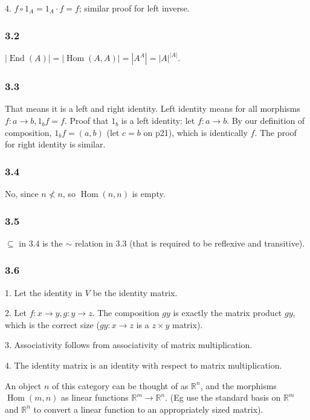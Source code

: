\documentclass{article}
\DeclareMathOperator{\Hom}{Hom}
\DeclareMathOperator{\End}{End}
\def\R{\mathbb{R}}
\begin{document}
4. $f \circ 1_A = 1_A \cdot f = f$; similar proof for left inverse.

\subsubsection*{3.2}

$|\End(A)| = |\Hom(A, A)| = |A^A| = |A|^{|A|}$.

\subsubsection*{3.3}

That means it is a left and right identity. Left identity means for all morphisms $f: a \to b, 1_bf = f$. Proof that $1_b$ is a left identity: let $f: a \to b$. By our definition of composition, $1_bf = (a, b)$ (let $c = b$ on p21), which is identically $f$. The proof for right identity is similar.

\subsubsection*{3.4}

No, since $n \not< n$, so $\Hom(n, n)$ is empty.

\subsubsection*{3.5}

$\subseteq$ in 3.4 is the $\sim$ relation in 3.3 (that is required to be reflexive and transitive).

\subsubsection*{3.6}

1. Let the identity in $V$ be the identity matrix.

2. Let $f: x \to y, g: y \to z$. The composition $gy$ is exactly the matrix product $gy$, which is the correct size ($gy: x \to z$ is a $z \times y$ matrix).

3. Associativity follows from associativity of matrix multiplication.

4. The identity matrix is an identity with respect to matrix multiplication.

An object $n$ of this category can be thought of as $\R^n$, and the morphisms $\Hom(m, n)$ as linear functions $\R^m \to \R^n$. (Eg use the standard basis on $\R^m$ and $\R^n$ to convert a linear function to an appropriately sized matrix).
\end{document}
